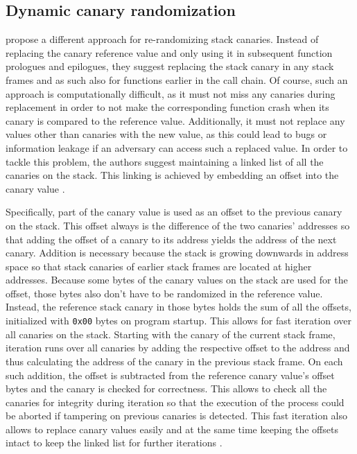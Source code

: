 \subsection{Dynamic canary randomization}
\label{subsec:dynamic-canary-randomization}

 propose a different approach for re-randomizing stack canaries.
Instead of replacing the canary reference value and only using it in subsequent function prologues and epilogues, they suggest replacing the stack canary in any stack frames and as such also for functions earlier in the call chain.
Of course, such an approach is computationally difficult, as it must not miss any canaries during replacement in order to not make the corresponding function crash when its canary is compared to the reference value.
Additionally, it must not replace any values other than canaries with the new value, as this could lead to bugs or information leakage if an adversary can access such a replaced value.
In order to tackle this problem, the authors suggest maintaining a linked list of all the canaries on the stack.
This linking is achieved by embedding an offset into the canary value \cite{Hawkins2016}.

Specifically, part of the canary value is used as an offset to the previous canary on the stack.
This offset always is the difference of the two canaries' addresses so that adding the offset of a canary to its address yields the address of the next canary.
Addition is necessary because the stack is growing downwards in address space so that stack canaries of earlier stack frames are located at higher addresses.
Because some bytes of the canary values on the stack are used for the offset, those bytes also don't have to be randomized in the reference value.
Instead, the reference stack canary in those bytes holds the sum of all the offsets, initialized with \texttt{0x00} bytes on program startup.
This allows for fast iteration over all canaries on the stack.
Starting with the canary of the current stack frame, iteration runs over all canaries by adding the respective offset to the address and thus calculating the address of the canary in the previous stack frame.
On each such addition, the offset is subtracted from the reference canary value's offset bytes and the canary is checked for correctness.
This allows to check all the canaries for integrity during iteration so that the execution of the process could be aborted if tampering on previous canaries is detected.
This fast iteration also allows to replace canary values easily and at the same time keeping the offsets intact to keep the linked list for further iterations \cite{Hawkins2016}.

